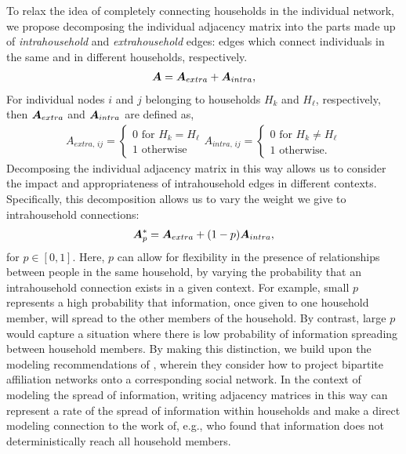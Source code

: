 To relax the idea of completely connecting households in the individual network, we propose decomposing the individual adjacency matrix into the parts made up of \textit{intrahousehold} and \textit{extrahousehold} edges: edges which connect individuals in the same and in different households, respectively. 
\begin{align*}
    \boldsymbol{A} = \boldsymbol{A}_{extra} + \boldsymbol{A}_{intra},
\end{align*}
For individual nodes $i$ and $j$ belonging to households $H_k$ and $H_\ell$, respectively, then $\boldsymbol{A}_{extra}$ and $\boldsymbol{A}_{intra}$ are defined as,
\begin{align*}
    A_{extra, \, ij} = \begin{cases}
        0 \textrm{ for } H_k = H_\ell\\
        1 \textrm{ otherwise}
    \end{cases} A_{intra, \, ij} = \begin{cases}
        0 \textrm{ for } H_k \neq H_\ell\\
        1 \textrm{ otherwise.}
    \end{cases}
\end{align*}
Decomposing the individual adjacency matrix in this way allows us to consider the impact and appropriateness of intrahousehold edges in different contexts. Specifically, this decomposition allows us to vary the weight we give to intrahousehold connections:
\begin{align*}
    \boldsymbol{A}^*_p = \boldsymbol{A}_{extra} + (1- p) \boldsymbol{A}_{intra},
\end{align*}
for $p \in [0,1]$. Here, $p$ can allow for flexibility in the presence of relationships between people in the same household, by varying the probability that an intrahousehold connection exists in a given context. For example, small $p$ represents a high probability that information, once given to one household member, will spread to the other members of the household. By contrast, large $p$ would capture a situation where there is low probability of information spreading between household members. By making this distinction, we build upon the modeling recommendations of \cite{newman2003social}, wherein they consider how to project bipartite affiliation networks onto a corresponding social network. In the context of modeling the spread of information, writing adjacency matrices in this way can represent a rate of the spread of information within households and make a direct modeling connection to the work of, e.g., \cite{nickerson2008} who found that information does not deterministically reach all household members. 

